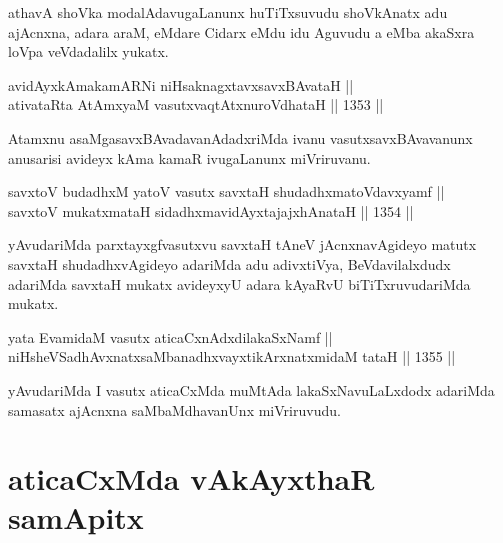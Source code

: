 \begin{artha}
athavA shoVka modalAdavugaLanunx huTiTxsuvudu shoVkAnatx adu ajAcnxna, adara araM, eMdare Cidarx eMdu idu Aguvudu a eMba akaSxra loVpa veVdadalilx yukatx.
\end{artha}


\begin{shl}
avidAyxkAmakamARNi niHsaknagxtavxsavxBAvataH || \\
ativataRta AtAmx\s yaM vasutxvaqtAtxnuroVdhataH \hfill || 1353 ||  
\end{shl}

\begin{artha}
Atamxnu asaMgasavxBAvadavanAdadxriMda ivanu vasutxsavxBAvavanunx anusarisi avideyx kAma kamaR ivugaLanunx miVriruvanu.
\end{artha}


\begin{shl}
savxtoV budadhxM yatoV vasutx savxtaH shudadhxmatoV\s davxyamf || \\
savxtoV mukatxmataH sidadhxmavidAyxtajajxhAnataH \hfill || 1354 ||  
\end{shl}

\begin{artha}
yAvudariMda parxtayxgfvasutxvu savxtaH tAneV jAcnxnavAgideyo matutx savxtaH shudadhxvAgideyo adariMda adu adivxtiVya, BeVdavilalxdudx adariMda savxtaH mukatx avideyxyU adara kAyaRvU biTiTxruvudariMda mukatx.
\end{artha}


\begin{shl}
yata EvamidaM vasutx aticaCxnAdxdilakaSxNamf || \\
niHsheVSadhAvxnatxsaMbanadhxvayxtikArxnatxmidaM tataH \hfill || 1355 ||  
\end{shl}

\begin{artha}
yAvudariMda I vasutx aticaCxMda muMtAda lakaSxNavuLaLxdodx adariMda samasatx ajAcnxna saMbaMdhavanUnx miVriruvudu.
\end{artha}

\section*{aticaCxMda vAkAyxthaR samApitx}

